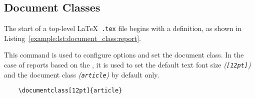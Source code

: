 \subsection{Document Classes}
The start of a top-level \LaTeX\ \texttt{.tex} file begins with a  definition, as shown in Listing~\ref{example:lst:document_class:report}.

This command is used to configure options and set the document class. In the case of reports based on the \uswdwmspkg{}, it is used to set the default text font size \textit{(\texttt{[12pt]})} and the document class \textit{(\texttt{article})} by default only.


\begin{listing}[H]
  \captionsetup{skip=\skiplistingcaptionlen}
  \begin{verbatim}
    \documentclass[12pt]{article}
  \end{verbatim}
  \caption{\LaTeX\ \texttt{\textbackslash documentclass} command example}
  \label{example:lst:document_class:report}
\end{listing}
